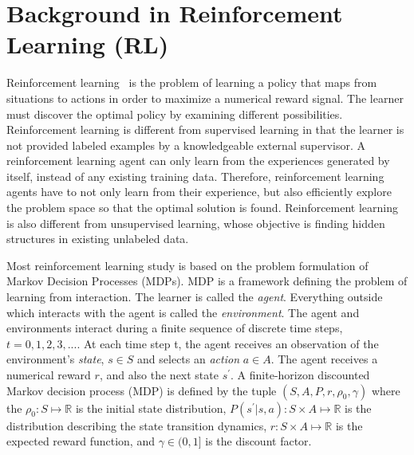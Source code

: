 \section{Background in Reinforcement Learning (RL)}
Reinforcement learning~\cite{sutton1998reinforcement} is the problem of learning a policy that maps from situations to actions in order to maximize a numerical reward signal. The learner must discover the optimal policy by examining different possibilities. Reinforcement learning is different from supervised learning in that the learner is not provided labeled examples by a knowledgeable external supervisor. A reinforcement learning agent can only learn from the experiences generated by itself, instead of any existing training data. Therefore, reinforcement learning agents have to not only learn from their experience, but also efficiently explore the problem space so that the optimal solution is found.  Reinforcement learning is also different from unsupervised learning, whose objective is finding hidden structures in existing unlabeled data.

Most reinforcement learning study is based on the problem formulation of Markov Decision Processes (MDPs). MDP is a framework defining the problem of learning from interaction. The learner is called the \textit{agent}. Everything outside which interacts with the agent is called the \textit{environment}.
The agent and environments interact during a finite sequence of discrete time steps, $t=0,1,2,3,...$. At each time step t, the agent receives an observation of the environment's \textit{state}, $s \in S$ and selects an \textit{action} $a \in A$. The agent receives a numerical reward $r$, and also the next state $s^\prime$.  A finite-horizon discounted Markov decision process (MDP) is defined by the tuple $(S,A,P,r,\rho_0,\gamma) $ where the $\rho_0 : S \mapsto \mathbb{R}$ is the initial state distribution, $P(s^\prime|s,a) : S \times A \mapsto \mathbb{R}$ is the distribution describing the state transition dynamics, $r : S \times A \mapsto \mathbb{R}$ is the expected reward function, and $\gamma \in (0,1]$ is the discount factor.

